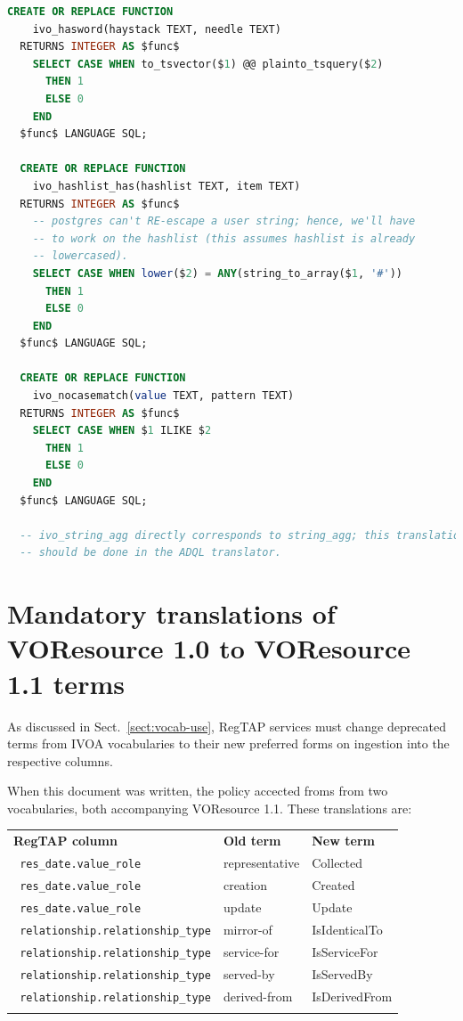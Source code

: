 \documentclass[11pt,a4paper]{ivoa}
\newcommand{\rtent}[1]{\texttt{\color{rtcolor} #1}}
\begin{document}
\begin{lstlisting}[language=SQL,flexiblecolumns=true,basicstyle=\footnotesize]
  CREATE OR REPLACE FUNCTION 
    ivo_hasword(haystack TEXT, needle TEXT)
  RETURNS INTEGER AS $func$
    SELECT CASE WHEN to_tsvector($1) @@ plainto_tsquery($2) 
      THEN 1 
      ELSE 0 
    END
  $func$ LANGUAGE SQL;

  CREATE OR REPLACE FUNCTION 
    ivo_hashlist_has(hashlist TEXT, item TEXT)
  RETURNS INTEGER AS $func$
    -- postgres can't RE-escape a user string; hence, we'll have
    -- to work on the hashlist (this assumes hashlist is already
    -- lowercased).
    SELECT CASE WHEN lower($2) = ANY(string_to_array($1, '#'))
      THEN 1 
      ELSE 0 
    END
  $func$ LANGUAGE SQL;

  CREATE OR REPLACE FUNCTION 
    ivo_nocasematch(value TEXT, pattern TEXT)
  RETURNS INTEGER AS $func$
    SELECT CASE WHEN $1 ILIKE $2
      THEN 1 
      ELSE 0 
    END
  $func$ LANGUAGE SQL;

  -- ivo_string_agg directly corresponds to string_agg; this translation
  -- should be done in the ADQL translator.
\end{lstlisting}


\section{Mandatory translations of VOResource 1.0 to VOResource 1.1
terms}
\label{app:voctrans}

As discussed in Sect.~\ref{sect:vocab-use}, RegTAP services must change
deprecated terms from IVOA vocabularies to their new preferred forms on
ingestion into the respective columns.

When this document was written, the policy accected froms from two
vocabularies, both accompanying VOResource 1.1.  These translations are:

\begin{inlinetable}
\begin{tabular}{lll}
\sptablerule
\textbf{RegTAP column}&\textbf{Old term}&\textbf{New term}\\
\sptablerule
\rtent{res\_date.value\_role}&representative&Collected\\
\rtent{res\_date.value\_role}&creation&Created\\
\rtent{res\_date.value\_role}&update&Update\\
\rtent{relationship.relationship\_type}&mirror-of&IsIdenticalTo\\
\rtent{relationship.relationship\_type}&service-for&IsServiceFor\\
\rtent{relationship.relationship\_type}&served-by&IsServedBy\\
\rtent{relationship.relationship\_type}&derived-from&IsDerivedFrom\\
\sptablerule
\end{tabular}
\end{inlinetable}
\end{document}
